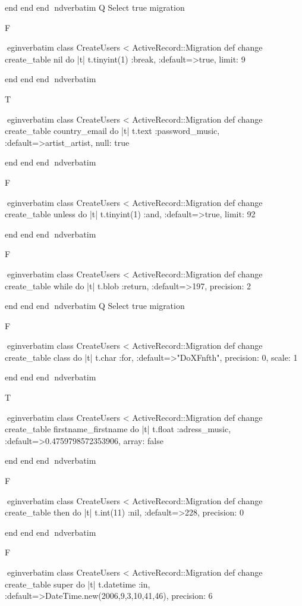     end 
  end 
end
nd{verbatim}
Q
 Select true migration

F

egin{verbatim}
 class CreateUsers < ActiveRecord::Migration 
  def change 
    create_table nil do |t| 
      t.tinyint(1) :break, :default=>true, limit: 9
    
    end 
  end 
end
nd{verbatim}

T

egin{verbatim}
 class CreateUsers < ActiveRecord::Migration 
  def change 
    create_table country_email do |t| 
      t.text :password_music, :default=>artist_artist, null: true
    
    end 
  end 
end
nd{verbatim}

F

egin{verbatim}
 class CreateUsers < ActiveRecord::Migration 
  def change 
    create_table unless do |t| 
      t.tinyint(1) :and, :default=>true, limit: 92
    
    end 
  end 
end
nd{verbatim}

F

egin{verbatim}
 class CreateUsers < ActiveRecord::Migration 
  def change 
    create_table while do |t| 
      t.blob :return, :default=>197, precision: 2
    
    end 
  end 
end
nd{verbatim}
Q
 Select true migration

F

egin{verbatim}
 class CreateUsers < ActiveRecord::Migration 
  def change 
    create_table class do |t| 
      t.char :for, :default=>"DoXFnfth", precision: 0, scale: 1
    
    end 
  end 
end
nd{verbatim}

T

egin{verbatim}
 class CreateUsers < ActiveRecord::Migration 
  def change 
    create_table firstname_firstname do |t| 
      t.float :adress_music, :default=>0.4759798572353906, array: false
    
    end 
  end 
end
nd{verbatim}

F

egin{verbatim}
 class CreateUsers < ActiveRecord::Migration 
  def change 
    create_table then do |t| 
      t.int(11) :nil, :default=>228, precision: 0
    
    end 
  end 
end
nd{verbatim}

F

egin{verbatim}
 class CreateUsers < ActiveRecord::Migration 
  def change 
    create_table super do |t| 
      t.datetime :in, :default=>DateTime.new(2006,9,3,10,41,46), precision: 6
    
